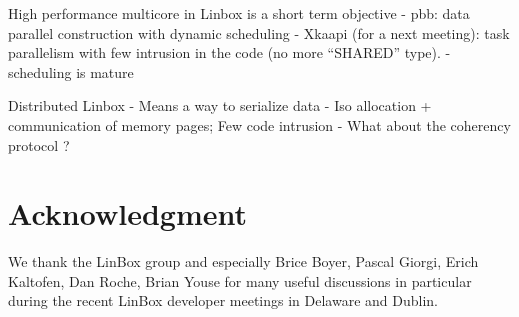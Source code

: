 \documentclass{article}
\newcommand{\linbox}{{\sc LinBox}\xspace}
\begin{document}
High performance multicore in Linbox is a short term
objective
- pbb: data parallel construction with dynamic scheduling
- Xkaapi (for a next meeting): task parallelism with few
intrusion in the code (no more ``SHARED'' type).
- scheduling is mature

Distributed Linbox
- Means a way to serialize data
- Iso allocation + communication of memory pages; Few code intrusion
- What about the coherency protocol ?

\section*{Acknowledgment}
We thank the \linbox group and especially Brice Boyer, Pascal Giorgi,
Erich Kaltofen, Dan Roche, Brian Youse for many useful discussions 
in particular during the recent \linbox developer meetings in
Delaware and Dublin.


 
\end{document}
